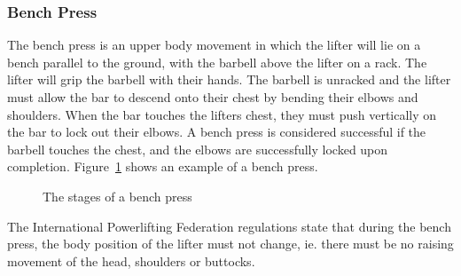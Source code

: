 \subsubsection{Bench Press}

The bench press is an upper body movement in which the lifter will lie on a bench parallel to the ground, with the barbell above the lifter on a rack. The lifter will grip the barbell with their hands. The barbell is unracked and the lifter must allow the bar to descend onto their chest by bending their elbows and shoulders. When the bar touches the lifters chest, they must push vertically on the bar to lock out their elbows. A bench press is considered successful if the barbell touches the chest, and the elbows are successfully locked upon completion. Figure~\ref{fig:bench_stages} shows an example of a bench press.

\begin{figure}[H]
    \centering
\caption{The stages of a bench press}
\label{fig:bench_stages}
\end{figure}

The International Powerlifting Federation regulations\cite{ipf} state that during the bench press, the body position of the lifter must not change, ie. there must be no raising movement of the head, shoulders or buttocks.